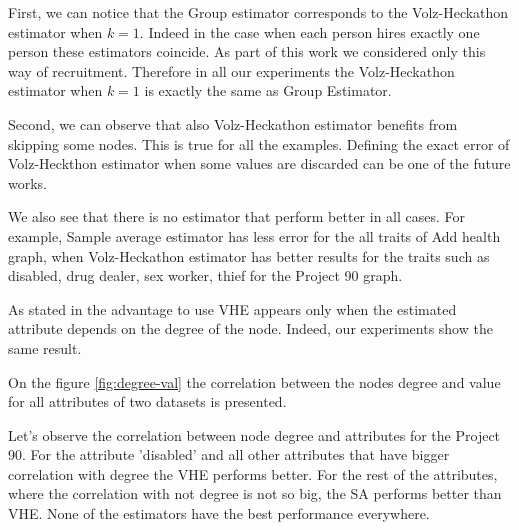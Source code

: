 \documentclass[12pt]{report}
\begin{document}
\begin{figure}[h]
\end{figure} 


First, we can notice that the Group estimator corresponds to the Volz-Heckathon estimator when $k = 1$. Indeed in the case when each person hires exactly one person these estimators coincide. As part of this work we considered only this way of recruitment. Therefore in all our experiments the Volz-Heckathon estimator when $k=1$ is exactly the same as Group Estimator.

Second, we can observe that also Volz-Heckathon estimator benefits from skipping some nodes. This is true for all the examples. Defining the exact error of Volz-Heckthon estimator when some values are discarded can be one of the future works.

We also see that there is no estimator that perform better in all cases. For example, Sample average estimator has less error for the all traits of Add health graph, when Volz-Heckathon estimator has better results for the traits such as disabled, drug dealer, sex worker, thief for the Project 90 graph.


As stated in \cite{goel2010assessing} the advantage to use VHE appears only when the estimated attribute depends on the degree of the node. Indeed, our experiments show the same result. 

On the figure \ref{fig:degree-val} the correlation between the nodes degree and value for all attributes of two datasets is presented.

Let's observe the correlation between node degree and attributes for the Project 90. For the attribute 'disabled' and all other attributes that have bigger correlation with degree the VHE performs better. For the rest of the attributes, where the correlation with not degree is not so big, the SA performs better than VHE. None of the estimators have the best performance everywhere. 
\end{document}
